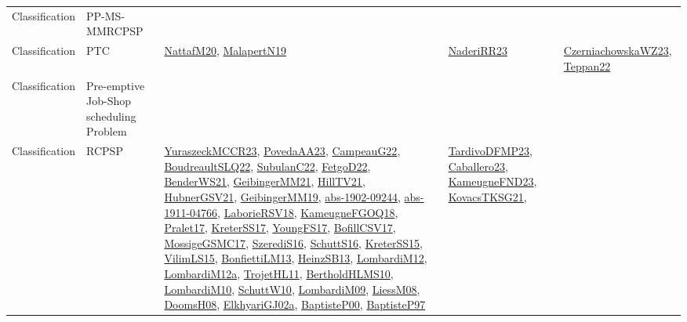 {\begin{longtable}{lp{3cm}>{\raggedright}p{6cm}>{\raggedright}p{6cm}p{8cm}}
Classification & PP-MS-MMRCPSP &  &  & \\
Classification & PTC & \href{papers/NattafM20.pdf}{NattafM20}\cite{NattafM20}, \href{papers/MalapertN19.pdf}{MalapertN19}\cite{MalapertN19} & \href{articles/NaderiRR23.pdf}{NaderiRR23}\cite{NaderiRR23} & \href{articles/CzerniachowskaWZ23.pdf}{CzerniachowskaWZ23}\cite{CzerniachowskaWZ23}, \href{papers/Teppan22.pdf}{Teppan22}\cite{Teppan22}\\
Classification & Pre-emptive Job-Shop scheduling Problem &  &  & \\
Classification & RCPSP & \href{articles/YuraszeckMCCR23.pdf}{YuraszeckMCCR23}\cite{YuraszeckMCCR23}, \href{papers/PovedaAA23.pdf}{PovedaAA23}\cite{PovedaAA23}, \href{articles/CampeauG22.pdf}{CampeauG22}\cite{CampeauG22}, \href{papers/BoudreaultSLQ22.pdf}{BoudreaultSLQ22}\cite{BoudreaultSLQ22}, \href{articles/SubulanC22.pdf}{SubulanC22}\cite{SubulanC22}, \href{articles/FetgoD22.pdf}{FetgoD22}\cite{FetgoD22}, \href{papers/BenderWS21.pdf}{BenderWS21}\cite{BenderWS21}, \href{papers/GeibingerMM21.pdf}{GeibingerMM21}\cite{GeibingerMM21}, \href{papers/HillTV21.pdf}{HillTV21}\cite{HillTV21}, \href{articles/HubnerGSV21.pdf}{HubnerGSV21}\cite{HubnerGSV21}, \href{papers/GeibingerMM19.pdf}{GeibingerMM19}\cite{GeibingerMM19}, \href{articles/abs-1902-09244.pdf}{abs-1902-09244}\cite{abs-1902-09244}, \href{articles/abs-1911-04766.pdf}{abs-1911-04766}\cite{abs-1911-04766}, \href{articles/LaborieRSV18.pdf}{LaborieRSV18}\cite{LaborieRSV18}, \href{papers/KameugneFGOQ18.pdf}{KameugneFGOQ18}\cite{KameugneFGOQ18}, \href{papers/Pralet17.pdf}{Pralet17}\cite{Pralet17}, \href{articles/KreterSS17.pdf}{KreterSS17}\cite{KreterSS17}, \href{papers/YoungFS17.pdf}{YoungFS17}\cite{YoungFS17}, \href{papers/BofillCSV17.pdf}{BofillCSV17}\cite{BofillCSV17}, \href{papers/MossigeGSMC17.pdf}{MossigeGSMC17}\cite{MossigeGSMC17}, \href{papers/SzerediS16.pdf}{SzerediS16}\cite{SzerediS16}, \href{papers/SchuttS16.pdf}{SchuttS16}\cite{SchuttS16}, \href{papers/KreterSS15.pdf}{KreterSS15}\cite{KreterSS15}, \href{papers/VilimLS15.pdf}{VilimLS15}\cite{VilimLS15}, \href{papers/BonfiettiLM13.pdf}{BonfiettiLM13}\cite{BonfiettiLM13}, \href{articles/HeinzSB13.pdf}{HeinzSB13}\cite{HeinzSB13}, \href{articles/LombardiM12.pdf}{LombardiM12}\cite{LombardiM12}, \href{articles/LombardiM12a.pdf}{LombardiM12a}\cite{LombardiM12a}, \href{articles/TrojetHL11.pdf}{TrojetHL11}\cite{TrojetHL11}, \href{papers/BertholdHLMS10.pdf}{BertholdHLMS10}\cite{BertholdHLMS10}, \href{papers/LombardiM10.pdf}{LombardiM10}\cite{LombardiM10}, \href{papers/SchuttW10.pdf}{SchuttW10}\cite{SchuttW10}, \href{papers/LombardiM09.pdf}{LombardiM09}\cite{LombardiM09}, \href{articles/LiessM08.pdf}{LiessM08}\cite{LiessM08}, \href{papers/DoomsH08.pdf}{DoomsH08}\cite{DoomsH08}, \href{papers/ElkhyariGJ02a.pdf}{ElkhyariGJ02a}\cite{ElkhyariGJ02a}, \href{articles/BaptisteP00.pdf}{BaptisteP00}\cite{BaptisteP00}, \href{papers/BaptisteP97.pdf}{BaptisteP97}\cite{BaptisteP97} & \href{papers/TardivoDFMP23.pdf}{TardivoDFMP23}\cite{TardivoDFMP23}, \href{articles/Caballero23.pdf}{Caballero23}\cite{Caballero23}, \href{papers/KameugneFND23.pdf}{KameugneFND23}\cite{KameugneFND23}, \href{papers/KovacsTKSG21.pdf}{KovacsTKSG21}\cite{KovacsTKSG21}, 
\end{longtable}}
